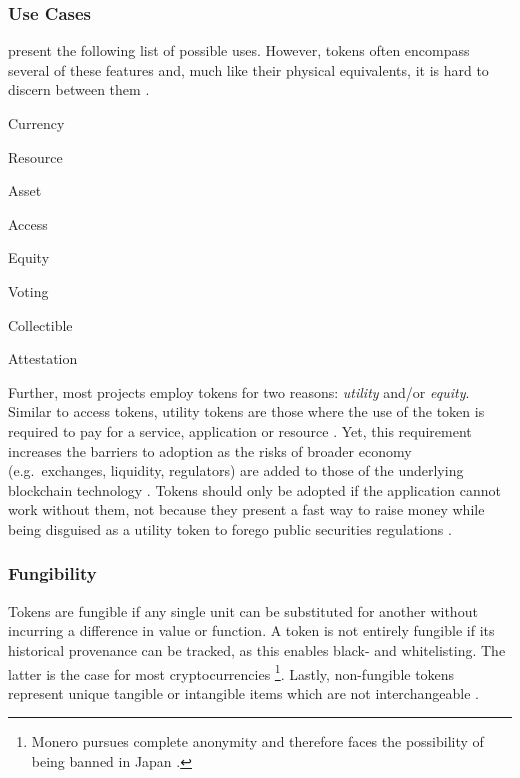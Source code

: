 \subsubsection{Use Cases}
\citeauthor{Antonopoulos.2018} present the following list of possible uses. However, tokens often encompass several of these features and, much like their physical equivalents, it is hard to discern between them \cite[pp.~173--174]{Antonopoulos.2018}.

\begin{AutoMultiColItemize}
  \item Currency
  \item Resource
  \item Asset
  \item Access
  \item Equity
  \item Voting
  \item Collectible
  \item Attestation
\end{AutoMultiColItemize}


Further, most projects employ tokens for two reasons: \textit{utility} and/or \textit{equity}. Similar to access tokens, utility tokens are those where the use of the token is required to pay for a service, application or resource \cite[p.~176]{Antonopoulos.2018}. Yet, this requirement increases the barriers to adoption as the risks of broader economy (e.g.~exchanges, liquidity, regulators) are added to those of the underlying blockchain technology \cite[pp.~177]{Antonopoulos.2018}. Tokens should only be adopted if the application cannot work without them, not because they present a fast way to raise money while being disguised as a utility token to forego public securities regulations \cite[p.~178]{Antonopoulos.2018}.

\subsubsection{Fungibility}
\label{sec:fungibility}
Tokens are fungible if any single unit can be substituted for another without incurring a difference in value or function. A token is not entirely fungible if its historical provenance can be tracked, as this enables black- and whitelisting. The latter is the case for most cryptocurrencies \footnote{Monero pursues complete anonymity and therefore faces the possibility of being banned in Japan \cite{monero}.}. Lastly, non-fungible tokens represent unique tangible or intangible items which are not interchangeable \cite[p.~175]{Antonopoulos.2018}.

